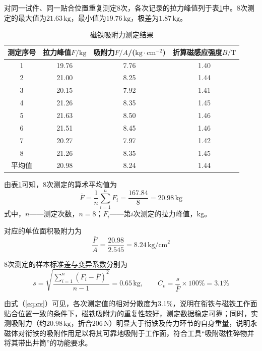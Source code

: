 对同一试件、同一贴合位置重复测定8次，各次记录的拉力峰值列于表\ref{tab:magnet_adsorption_force}中。8次测定的最大值为$21.63\,\text{kg}$，最小值为$19.76\,\text{kg}$，极差为$1.87\,\text{kg}$。

\begin{table}[htbp]
	\centering
	\caption{磁铁吸附力测定结果}
	\label{tab:magnet_adsorption_force}
	\renewcommand{\arraystretch}{1.3}
	\begin{tabular}{cccc}
		\toprule
		测定序号 & 拉力峰值$F/\text{kg}$ & 吸附力$F/A$/($\text{kg}\cdot\text{cm}^{-2}$) & 折算磁感应强度$B/\text{T}$ \\
		\midrule
		1 & 19.76 & 7.76 & 1.40 \\
		2 & 21.00 & 8.25 & 1.44 \\
		3 & 20.15 & 7.92 & 1.41 \\
		4 & 21.26 & 8.35 & 1.45 \\
		5 & 21.63 & 8.50 & 1.46 \\
		6 & 21.51 & 8.45 & 1.46 \\
		7 & 20.27 & 7.97 & 1.42 \\
		8 & 21.26 & 8.35 & 1.45 \\
		\midrule
		平均值 & 20.98 & 8.24 & 1.44 \\
		\bottomrule
	\end{tabular}
\end{table}

由表\ref{tab:magnet_adsorption_force}可知，8次测定的算术平均值为
\begin{equation}
	\bar F=\frac{1}{n}\sum_{i=1}^{n}F_i=\frac{167.84}{8}=20.98\,\text{kg}
\end{equation}
式中，$n$——测定次数，$n=8$；$F_i$——第$i$次测定的拉力峰值，$\text{kg}$。

对应的单位面积吸附力为
\begin{equation}
	\frac{\bar F}{A}=\frac{20.98}{2.545}=8.24\,\text{kg/cm}^2
\end{equation}

8次测定的样本标准差与变异系数分别为
\begin{equation}
	s=\sqrt{\frac{\sum_{i=1}^{n}(F_i-\bar F)^2}{n-1}}=0.65\,\text{kg},\qquad
	C_v=\frac{s}{\bar F}\times 100\%=3.1\%
	\label{eq:cv}
\end{equation}

由式（\ref{eq:cv}）可见，各次测定值的相对分散度为3.1\%，说明在衔铁与磁铁工作面贴合位置一致的条件下，磁铁吸附力的重复性较好，测定数据稳定可靠；同时，实测吸附力（约$20.98\,\text{kg}$，折合$206\,\text{N}$）明显大于衔铁及传力环节的自身重量，说明永磁体对衔铁的吸附作用足以将其可靠地吸附于工作面，符合工具“吸附磁性碎物并将其带出井筒”的功能要求。

